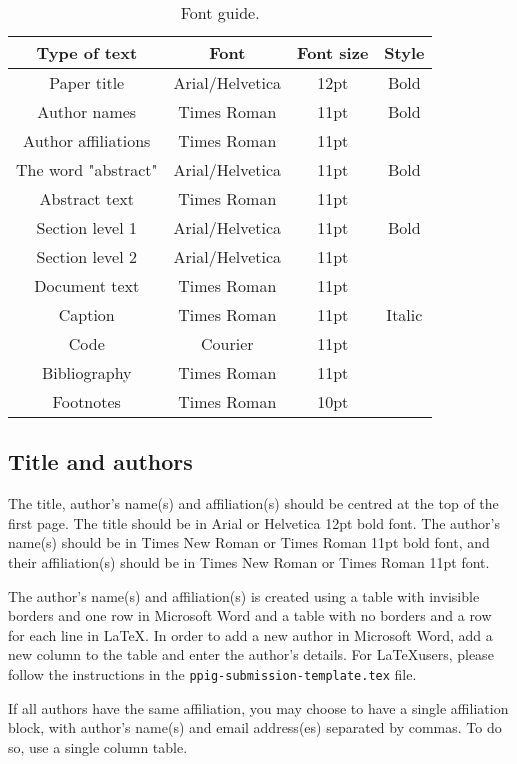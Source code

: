 \documentclass{ppig}
\begin{document}
\begin{table}[h]
	\begin{center}
		\begin{tabular}{@{}cccc@{}}\toprule
			Type of text & Font & Font size & Style\\\midrule
			Paper title & Arial/Helvetica & 12pt & Bold\\
			Author names & Times Roman & 11pt & Bold\\
			Author affiliations & Times Roman & 11pt &\\
			The word "abstract" & Arial/Helvetica & 11pt & Bold\\
			Abstract text & Times Roman & 11pt &\\
			Section level 1 & Arial/Helvetica & 11pt & Bold\\
			Section level 2 & Arial/Helvetica & 11pt &\\
			Document text & Times Roman & 11pt & \\
			Caption & Times Roman & 11pt & Italic\\
			Code & Courier & 11pt &\\
			Bibliography & Times Roman & 11pt &\\
			Footnotes & Times Roman & 10pt &\\
			\bottomrule
		\end{tabular}
		\caption{Font guide.}
		\label{tbl:font-guide}
	\end{center}
\end{table}


\subsection{Title and authors}

The title, author's name(s) and affiliation(s) should be centred at the top of the first page. The title should be in Arial or Helvetica 12pt bold font. The author's name(s) should be in Times New Roman or Times Roman 11pt bold font, and their affiliation(s) should be in Times New Roman or Times Roman 11pt font.

The author's name(s) and affiliation(s) is created using a table with invisible borders and one row in Microsoft Word and a table with no borders and a row for each line in \LaTeX. In order to add a new author in Microsoft Word, add a new column to the table and enter the author's details. For \LaTeX users, please follow the instructions in the \texttt{ppig-submission-template.tex} file.

If all authors have the same affiliation, you may choose to have a single affiliation block, with author's name(s) and email address(es) separated by commas. To do so, use a single column table.
\end{document}
